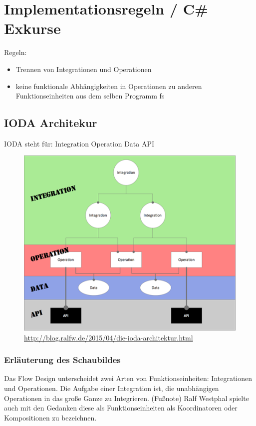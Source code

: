 \documentclass[11pt]{article}
\begin{document}
\section{Implementationsregeln / C\# Exkurse}
\label{sec:orgheadline44}

Regeln:
\begin{itemize}
\item Trennen von Integrationen und Operationen
\item keine funktionale Abhängigkeiten in Operationen zu anderen Funktionseinheiten aus dem selben Programm
fs
\end{itemize}
\subsection{IODA Architekur}
\label{sec:orgheadline25}
IODA steht für: Integration Operation Data API
\begin{figure}[htb]
\centering
\includegraphics[width=.9\linewidth]{./img/ioda1.png}
\caption{\url{http://blog.ralfw.de/2015/04/die-ioda-architektur.html}}
\end{figure}

\subsubsection{Erläuterung des Schaubildes}
\label{sec:orgheadline24}
Das Flow Design unterscheidet zwei Arten von Funktionseinheiten: Integrationen und Operationen.
Die Aufgabe einer Integration ist, die unabhängigen Operationen in das große Ganze zu
Integrieren. 
(Fußnote) Ralf Westphal spielte auch mit den Gedanken diese als Funktionseinheiten als Koordinatoren oder
Kompositionen zu bezeichnen.
\end{document}
